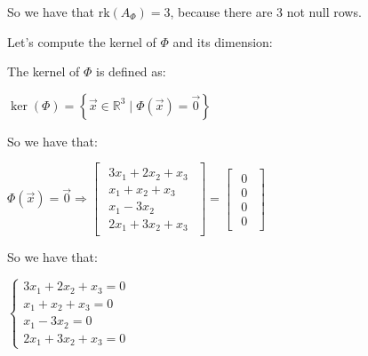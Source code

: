 \singlespacing
\singlespacing

So we have that $\text{rk}(A_\Phi)=3$, because there are 3 not null rows.

\singlespacing

Let's compute the kernel of $\Phi$ and its dimension:

\singlespacing

The kernel of $\Phi$ is defined as:

\singlespacing

\begin{math}
    \ker(\Phi)=\left\{\vec{x} \in \mathbb{R}^3 \mid \Phi(\vec{x})=\vec{0}\right\}
\end{math}

\singlespacing

So we have that:

\singlespacing

\begin{math}
    \Phi(\vec{x})=\vec{0} \Rightarrow \begin{bmatrix}
        \begin{array}{c}
            3x_1 + 2x_2 + x_3 \\
            x_1 + x_2 + x_3   \\
            x_1 - 3x_2        \\
            2x_1 + 3x_2 + x_3
        \end{array}
    \end{bmatrix} = \begin{bmatrix}
        \begin{array}{c}
            0 \\
            0 \\
            0 \\
            0
        \end{array}
    \end{bmatrix}
\end{math}

\singlespacing

So we have that:

\singlespacing

\begin{math}
    \begin{cases}
        3x_1 + 2x_2 + x_3 = 0 \\
        x_1 + x_2 + x_3 = 0   \\
        x_1 - 3x_2 = 0        \\
        2x_1 + 3x_2 + x_3 = 0
    \end{cases}
\end{math}

